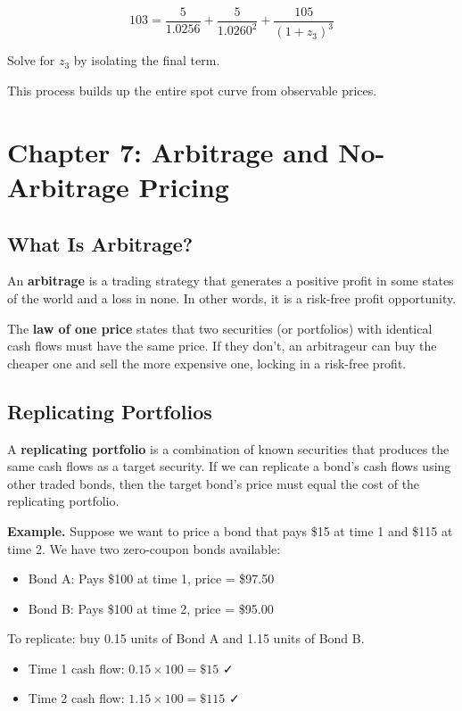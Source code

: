 \documentclass[11pt,letterpaper]{report}
\begin{document}
$$103 = \frac{5}{1.0256} + \frac{5}{1.0260^2} + \frac{105}{(1+z_3)^3}$$

Solve for $z_3$ by isolating the final term.

This process builds up the entire spot curve from observable prices.


\chapter{Chapter 7: Arbitrage and No-Arbitrage Pricing}


\section{What Is Arbitrage?}


An \textbf{arbitrage} is a trading strategy that generates a positive profit in some states of the world and a loss in none.  In other words, it is a risk-free profit opportunity.

The \textbf{law of one price} states that two securities (or portfolios) with identical cash flows must have the same price.  If they don't, an arbitrageur can buy the cheaper one and sell the more expensive one, locking in a risk-free profit.

\section{Replicating Portfolios}


A \textbf{replicating portfolio} is a combination of known securities that produces the same cash flows as a target security.  If we can replicate a bond's cash flows using other traded bonds, then the target bond's price must equal the cost of the replicating portfolio.

\textbf{Example.}  Suppose we want to price a bond that pays \$15 at time 1 and \$115 at time 2.  We have two zero-coupon bonds available:

\begin{itemize}
  \item Bond A: Pays \$100 at time 1, price = \$97.50
  \item Bond B: Pays \$100 at time 2, price = \$95.00
\end{itemize}

To replicate: buy 0.15 units of Bond A and 1.15 units of Bond B.

\begin{itemize}
  \item Time 1 cash flow: $0.15 \times 100 = \$15$ ✓
  \item Time 2 cash flow: $1.15 \times 100 = \$115$ ✓
\end{itemize}
\end{document}
